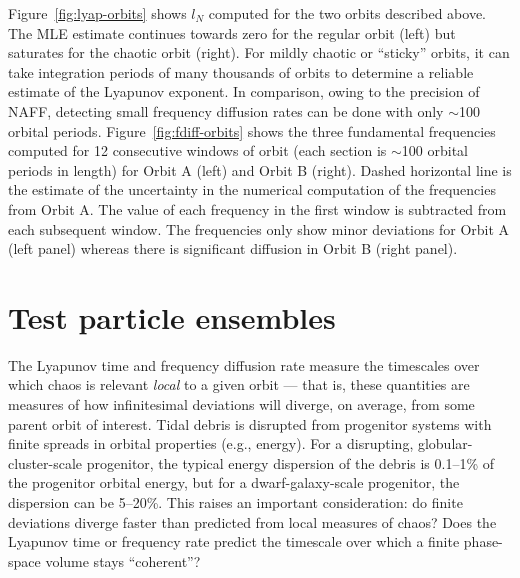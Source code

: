 \documentclass[letterpaper,12pt,preprint]{aastex}
\begin{document}
Figure~\ref{fig:lyap-orbits} shows $l_N$ computed for the two orbits described above. The MLE estimate continues towards zero for the regular orbit (left) but saturates for the chaotic orbit (right). For mildly chaotic or ``sticky'' orbits, it can take integration periods of many thousands of orbits to determine a reliable estimate of the Lyapunov exponent. In comparison, owing to the precision of NAFF, detecting small frequency diffusion rates can be done with only $\sim$100 orbital periods. Figure~\ref{fig:fdiff-orbits} shows the three fundamental frequencies computed for 12 consecutive windows of orbit (each section is $\sim$100 orbital periods in length) for Orbit A (left) and Orbit B (right). Dashed horizontal line is the estimate of the uncertainty in the numerical computation of the frequencies from Orbit A. The value of each frequency in the first window is subtracted from each subsequent window. The frequencies only show minor deviations for Orbit A (left panel) whereas there is significant diffusion in Orbit B (right panel).

\section{Test particle ensembles} \label{sec:ensemble}

The Lyapunov time and frequency diffusion rate measure the timescales over which chaos is relevant \emph{local} to a given orbit --- that is, these quantities are measures of how infinitesimal deviations will diverge, on average, from some parent orbit of interest. Tidal debris is disrupted from progenitor systems with finite spreads in orbital properties (e.g., energy). For a disrupting, globular-cluster-scale progenitor, the typical energy dispersion of the debris is 0.1--1\% of the progenitor orbital energy, but for a dwarf-galaxy-scale progenitor, the dispersion can be 5--20\%. This raises an important consideration: do finite deviations diverge faster than predicted from local measures of chaos? Does the Lyapunov time or frequency rate predict the timescale over which a finite phase-space volume stays ``coherent''?
\end{document}
